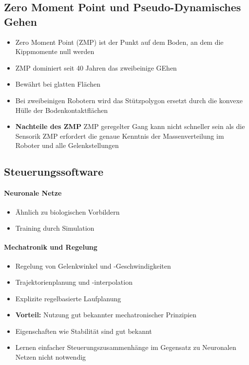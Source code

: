 \subsection{Zero Moment Point und Pseudo-Dynamisches Gehen}
\begin{itemize}
	\item Zero Moment Point (ZMP) ist der Punkt auf dem Boden, an dem die Kippmomente null werden
	\item ZMP dominiert seit 40 Jahren das zweibeinige GEhen
	\item Bewährt bei glatten Flächen
	\item Bei zweibeinigen Robotern wird das Stützpolygon ersetzt durch die konvexe Hülle der Bodenkontaktflächen
	\item \textbf{Nachteile des ZMP}
	\subitem ZMP geregelter Gang kann nicht schneller sein als die Sensorik
	\subitem ZMP erfordert die genaue Kenntnis der Massenverteilung im Roboter und alle Gelenkstellungen
\end{itemize}
\subsection{Steuerungssoftware}
\paragraph{Neuronale Netze}
\begin{itemize}
	\item Ähnlich zu biologischen Vorbildern
	\item Training durch Simulation
\end{itemize}
\paragraph{Mechatronik und Regelung}
\begin{itemize}
	\item Regelung von Gelenkwinkel und -Geschwindigkeiten
	\item Trajektorienplanung und -interpolation
	\item Explizite regelbasierte Laufplanung
	\item \textbf{Vorteil:} Nutzung gut bekannter mechatronischer Prinzipien 	
	\item Eigenschaften wie Stabilität sind gut bekannt
	\item Lernen einfacher Steuerungszusammenhänge im Gegensatz zu Neuronalen Netzen nicht notwendig
\end{itemize}
